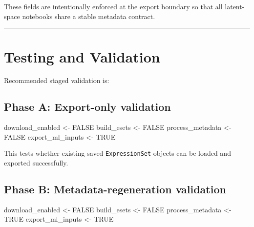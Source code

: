 \documentclass[
  letterpaper,
  DIV=11,
  numbers=noendperiod,
  openany,
  oneside]{scrreprt}
\newenvironment{Shaded}{\begin{snugshade}}{\end{snugshade}}
\newcommand{\ConstantTok}[1]{\textcolor[rgb]{0.56,0.35,0.01}{#1}}
\newcommand{\NormalTok}[1]{\textcolor[rgb]{0.00,0.23,0.31}{#1}}
\newcommand{\OtherTok}[1]{\textcolor[rgb]{0.00,0.23,0.31}{#1}}
\begin{document}
These fields are intentionally enforced at the export boundary so that
all latent-space notebooks share a stable metadata contract.

\begin{center}\rule{0.5\linewidth}{0.5pt}\end{center}

\section*{Testing and Validation}\label{testing-and-validation}


Recommended staged validation is:

\subsection*{Phase A: Export-only
validation}\label{phase-a-export-only-validation}

\begin{Shaded}
\begin{Highlighting}[]
\NormalTok{download\_enabled }\OtherTok{\textless{}{-}} \ConstantTok{FALSE}
\NormalTok{build\_esets      }\OtherTok{\textless{}{-}} \ConstantTok{FALSE}
\NormalTok{process\_metadata }\OtherTok{\textless{}{-}} \ConstantTok{FALSE}
\NormalTok{export\_ml\_inputs }\OtherTok{\textless{}{-}} \ConstantTok{TRUE}
\end{Highlighting}
\end{Shaded}

This tests whether existing saved \texttt{ExpressionSet} objects can be
loaded and exported successfully.

\subsection*{Phase B: Metadata-regeneration
validation}\label{phase-b-metadata-regeneration-validation}

\begin{Shaded}
\begin{Highlighting}[]
\NormalTok{download\_enabled }\OtherTok{\textless{}{-}} \ConstantTok{FALSE}
\NormalTok{build\_esets      }\OtherTok{\textless{}{-}} \ConstantTok{FALSE}
\NormalTok{process\_metadata }\OtherTok{\textless{}{-}} \ConstantTok{TRUE}
\NormalTok{export\_ml\_inputs }\OtherTok{\textless{}{-}} \ConstantTok{TRUE}
\end{Highlighting}
\end{Shaded}
\end{document}
